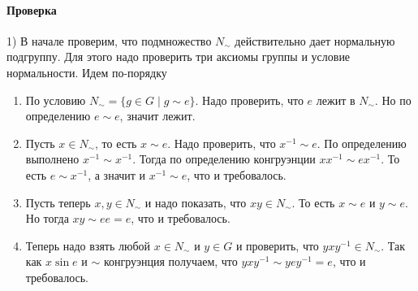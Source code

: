 \paragraph{Проверка}

1) В начале проверим, что подмножество $N_\sim$ действительно дает нормальную подгруппу.
Для этого надо проверить три аксиомы группы и условие нормальности.
Идем по-порядку
\begin{enumerate}
\item По условию $N_\sim = \{g\in G\mid g\sim e\}$.
Надо проверить, что $e$ лежит в $N_\sim$.
Но по определению $e \sim e$, значит лежит.

\item Пусть $x\in N_\sim$, то есть $x\sim e$.
Надо проверить, что $x^{-1}\sim e$.
По определению выполнено $x^{-1}\sim x^{-1}$.
Тогда по определению конгруэнции $x x^{-1} \sim e x^{-1}$.
То есть $e \sim x^{-1}$, а значит и $x^{-1}\sim e$, что и требовалось.

\item Пусть теперь $x,y\in N_\sim$ и надо показать, что $xy \in N_\sim$.
То есть $x\sim e$ и $y\sim e$.
Но тогда $x y \sim e e = e$, что и требовалось.

\item Теперь надо взять любой $x\in N_\sim$ и $y\in G$ и проверить, что $yxy^{-1}\in N_\sim$.
Так как $x\sin e$ и $\sim$ конгруэнция получаем, что $yxy^{-1}\sim y e y^{-1} = e$, что и требовалось.
\end{enumerate}


